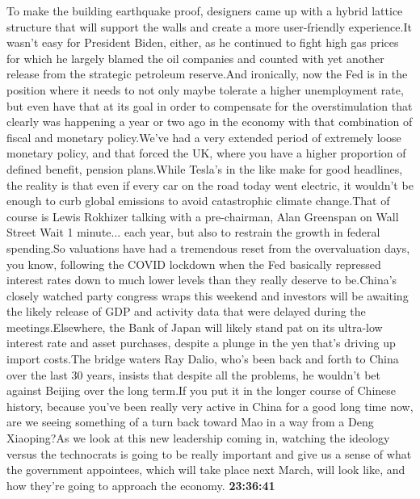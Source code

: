 \documentclass{article}%
\begin{document}
To make the building earthquake proof, designers came up with a hybrid lattice structure that will support the walls and create a more user{-}friendly experience.It wasn't easy for President Biden, either, as he continued to fight high gas prices for which he largely blamed the oil companies and counted with yet another release from the strategic petroleum reserve.And ironically, now the Fed is in the position where it needs to not only maybe tolerate a higher unemployment rate, but even have that at its goal in order to compensate for the overstimulation that clearly was happening a year or two ago in the economy with that combination of fiscal and monetary policy.We've had a very extended period of extremely loose monetary policy, and that forced the UK, where you have a higher proportion of defined benefit, pension plans.While Tesla's in the like make for good headlines, the reality is that even if every car on the road today went electric, it wouldn't be enough to curb global emissions to avoid catastrophic climate change.That of course is Lewis Rokhizer talking with a pre{-}chairman, Alan Greenspan on Wall Street Wait 1 minute...  each year, but also to restrain the growth in federal spending.So valuations have had a tremendous reset from the overvaluation days, you know, following the COVID lockdown when the Fed basically repressed interest rates down to much lower levels than they really deserve to be.China's closely watched party congress wraps this weekend and investors will be awaiting the likely release of GDP and activity data that were delayed during the meetings.Elsewhere, the Bank of Japan will likely stand pat on its ultra{-}low interest rate and asset purchases, despite a plunge in the yen that's driving up import costs.The bridge waters Ray Dalio, who's been back and forth to China over the last 30 years, insists that despite all the problems, he wouldn't bet against Beijing over the long term.If you put it in the longer course of Chinese history, because you've been really very active in China for a good long time now, are we seeing something of a turn back toward Mao in a way from a Deng Xiaoping?As we look at this new leadership coming in, watching the ideology versus the technocrats is going to be really important and give us a sense of what the government appointees, which will take place next March, will look like, and how they're going to approach the economy.%
\textbf{23:36:41}%
\end{document}
